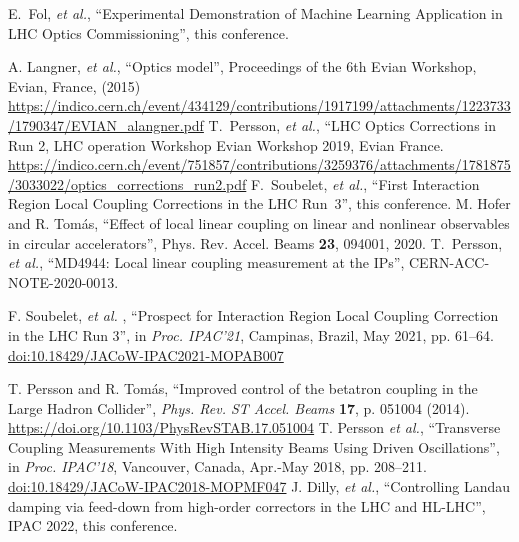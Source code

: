 \documentclass{cernatsnote}
\begin{document}
\begin{thebibliography}{99}
 E.~Fol, {\it et al.}, ``Experimental Demonstration of Machine Learning Application in LHC Optics Commissioning'', this conference.


 A. Langner, {\it et al.}, “Optics model”, Proceedings of the 6th Evian Workshop,
Evian, France, (2015) \url{https://indico.cern.ch/event/434129/contributions/1917199/attachments/1223733/1790347/EVIAN_alangner.pdf}
%
T.~Persson, {\it et al.}, ``LHC Optics Corrections in Run 2, LHC operation Workshop Evian Workshop 2019, Evian France.
\url{https://indico.cern.ch/event/751857/contributions/3259376/attachments/1781875/3033022/optics_corrections_run2.pdf}
%
 F.~Soubelet, {\it et al.}, ``First Interaction Region Local Coupling Corrections in the LHC Run~3'', this conference.
%
 M. Hofer and R. Tom\'as, ``Effect of local linear coupling on linear and nonlinear observables in circular accelerators'',
Phys. Rev. Accel. Beams {\bf23}, 094001, 2020.
%
 T.~Persson, {\it et al.}, ``MD4944: Local linear coupling measurement at the IPs'', CERN-ACC-NOTE-2020-0013.

   F. Soubelet,  {\it et al.} ,
   \textquotedblleft{Prospect for Interaction Region Local Coupling Correction in the LHC Run 3}\textquotedblright,
   in \emph{Proc. IPAC’21}, Campinas, Brazil, May 2021, pp. 61--64.
   \url{doi:10.18429/JACoW-IPAC2021-MOPAB007}  

 T. Persson and R. Tom\'as, ``Improved control of the betatron coupling in the Large Hadron Collider'',
{\it Phys. Rev. ST Accel. Beams} {\bf 17}, p. 051004 (2014).
\url{https://doi.org/10.1103/PhysRevSTAB.17.051004}
%
    T. Persson \emph{et al.},
   \textquotedblleft{Transverse Coupling Measurements With High Intensity Beams Using Driven Oscillations}\textquotedblright,
   in \emph{Proc. IPAC’18}, Vancouver, Canada, Apr.-May 2018, pp. 208--211.
   \url{doi:10.18429/JACoW-IPAC2018-MOPMF047}    
%
 J. Dilly, {\it et al.}, ``Controlling Landau damping via feed-down from high-order correctors in the LHC and HL-LHC'', IPAC 2022, this conference.

%


\end{thebibliography}
\end{document}
